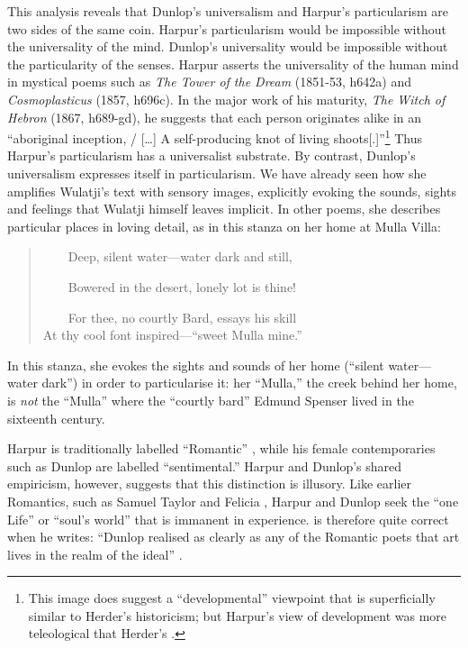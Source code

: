 \documentclass[
  Crown,
  times,
  sageh]{sagej}
\begin{document}
This analysis reveals that Dunlop's universalism and Harpur's
particularism are two sides of the same coin. Harpur's particularism
would be impossible without the universality of the mind. Dunlop's
universality would be impossible without the particularity of the
senses. Harpur asserts the universality of the human mind in mystical
poems such as \emph{The Tower of the Dream} (1851-53, h642a) and
\emph{Cosmoplasticus} (1857, h696c). In the major work of his maturity,
\emph{The Witch of Hebron} (1867, h689-gd), he suggests that each person
originates alike in an ``aboriginal inception, / {[}\ldots{]} A
self-producing knot of living shoots{[}.{]}''\footnote{This image does
  suggest a ``developmental'' viewpoint that is superficially similar to
  Herder's historicism; but Harpur's view of development was more
  teleological that Herder's \citep[6-10]{falk_endless_2019}.} Thus
Harpur's particularism has a universalist substrate. By contrast,
Dunlop's universalism expresses itself in particularism. We have already
seen how she amplifies Wulatji's text with sensory images, explicitly
evoking the sounds, sights and feelings that Wulatji himself leaves
implicit. In other poems, she describes particular places in loving
detail, as in this stanza on her home at Mulla Villa:

\begin{quote}
~~~~Deep, silent water---water dark and still,\\
\strut ~~~~Bowered in the desert, lonely lot is thine!\\
\strut ~~~~For thee, no courtly Bard, essays his skill\\
At thy cool font inspired---``sweet Mulla mine.''
\citep[198]{dunlop_selection_2021}
\end{quote}

In this stanza, she evokes the sights and sounds of her home (``silent
water---water dark'') in order to particularise it: her ``Mulla,'' the
creek behind her home, is \emph{not} the ``Mulla'' where the ``courtly
bard'' Edmund Spenser lived in the sixteenth century.

Harpur is traditionally labelled ``Romantic''
\citep[e.g.~by][]{kane_australian_1996, harpur_general_1987}, while his
female contemporaries such as Dunlop are labelled ``sentimental.''
Harpur and Dunlop's shared empiricism, however, suggests that this
distinction is illusory. Like earlier Romantics, such as Samuel Taylor
\citet{coleridge_eolian_1997} and Felicia \citet{hemans_beings_1839},
Harpur and Dunlop seek the ``one Life'' or ``soul's world'' that is
immanent in experience. \citet[69]{wu_morning_2021} is therefore quite
correct when he writes: ``Dunlop realised as clearly as any of the
Romantic poets that art lives in the realm of the ideal''
\citetext{\citealp[see
also][109]{minter_settlement_2021}; \citealp[79]{hansord_imperial_2021}}.
\end{document}
